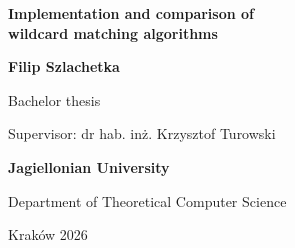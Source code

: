 \begin{titlepage}
    \centering
    \vspace*{3cm}
    
    {\Huge \textbf{Implementation and comparison of \\[0.5cm] wildcard matching algorithms} \par}
    \vspace{2cm}
    
    {\Large \textbf{Filip Szlachetka} \par}
    
    \vfill
    
    {\large Bachelor thesis \par}
    {\large Supervisor: dr hab. inż. Krzysztof Turowski  \par} 
    
    \vspace{1.5cm}
    
    {\large \textbf{Jagiellonian University} \par}
    {\large Department of Theoretical Computer Science \par}
    {\large Kraków 2026 \par}
    
\end{titlepage}
